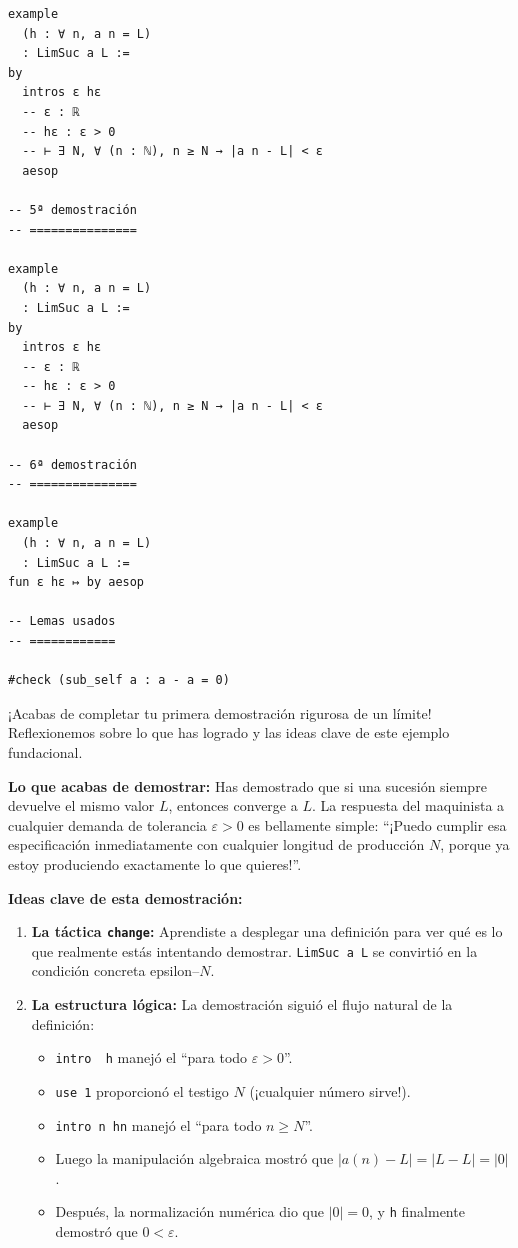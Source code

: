 \begin{verbatim}
example
  (h : ∀ n, a n = L)
  : LimSuc a L :=
by
  intros ε hε
  -- ε : ℝ
  -- hε : ε > 0
  -- ⊢ ∃ N, ∀ (n : ℕ), n ≥ N → |a n - L| < ε
  aesop

-- 5ª demostración
-- ===============

example
  (h : ∀ n, a n = L)
  : LimSuc a L :=
by
  intros ε hε
  -- ε : ℝ
  -- hε : ε > 0
  -- ⊢ ∃ N, ∀ (n : ℕ), n ≥ N → |a n - L| < ε
  aesop

-- 6ª demostración
-- ===============

example
  (h : ∀ n, a n = L)
  : LimSuc a L :=
fun ε hε ↦ by aesop

-- Lemas usados
-- ============

#check (sub_self a : a - a = 0)
\end{verbatim}

¡Acabas de completar tu primera demostración rigurosa de un límite!
Reflexionemos sobre lo que has logrado y las ideas clave de este ejemplo
fundacional.

\textbf{Lo que acabas de demostrar:} Has demostrado que si una sucesión
siempre devuelve el mismo valor $L$, entonces converge a $L$. La
respuesta del maquinista a cualquier demanda de tolerancia
$\varepsilon > 0$ es bellamente simple: ``¡Puedo cumplir esa especificación
inmediatamente con cualquier longitud de producción $N$, porque ya estoy
produciendo exactamente lo que quieres!''.

\textbf{Ideas clave de esta demostración:}
\begin{enumerate}
\item \textbf{La táctica \texttt{change}:} Aprendiste a desplegar una
  definición para ver qué es lo que realmente estás intentando
  demostrar. \texttt{LimSuc a L} se convirtió en la condición concreta
  epsilon--$N$.
\item \textbf{La estructura lógica:} La demostración siguió el flujo
  natural de la definición:
    \begin{itemize}
    \item \texttt{intro \epsilon\ h\epsilon} manejó el ``para todo $\varepsilon > 0$''.
    \item \texttt{use 1} proporcionó el testigo $N$ (¡cualquier número
      sirve!).
    \item \texttt{intro n hn} manejó el ``para todo $n \geq N$''.
    \item Luego la manipulación algebraica mostró que
      $|a(n) - L| = |L - L| = |0|$.
    \item Después, la normalización numérica dio que $|0| = 0$, y
      \texttt{h\epsilon} finalmente demostró que $0 < \varepsilon$.
    \end{itemize}
\end{enumerate}

